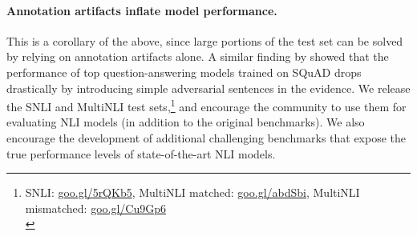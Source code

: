 \paragraph{Annotation artifacts inflate model performance.}
This is a corollary of the above, since large portions of the test set can be solved by relying on annotation artifacts alone. 
A similar finding by \citet{Jia:2017} showed that the performance of top question-answering models trained on SQuAD \cite{Rajpurkar:2016} drops drastically by introducing simple adversarial sentences in the evidence. 
We release the \hard SNLI and MultiNLI test sets,\footnote{SNLI: \url{goo.gl/5rQKb5}, MultiNLI matched: \url{goo.gl/abdSbi}, MultiNLI mismatched: \url{goo.gl/Cu9Gp6}\\}
and encourage the community to use them for evaluating NLI models (in addition to the original benchmarks).
We also encourage the development of additional challenging benchmarks that expose the true performance levels of state-of-the-art NLI models.

